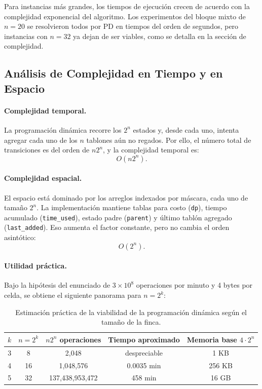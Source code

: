 \documentclass[12pt,a4paper]{article}
\begin{document}
Para instancias m\'as grandes, los tiempos de ejecuci\'on crecen de acuerdo con la complejidad exponencial del algoritmo. Los experimentos del bloque mixto de \(n=20\) se resolvieron todos por PD en tiempos del orden de segundos, pero instancias con \(n=32\) ya dejan de ser viables, como se detalla en la secci\'on de complejidad.

\subsection{An\'alisis de Complejidad en Tiempo y en Espacio}

\paragraph{Complejidad temporal.}
La programaci\'on din\'amica recorre los \(2^n\) estados y, desde cada uno, intenta agregar cada uno de los \(n\) tablones a\'un no regados. Por ello, el n\'umero total de transiciones es del orden de \(n2^n\), y la complejidad temporal es:
\[
O(n2^n).
\]

\paragraph{Complejidad espacial.}
El espacio est\'a dominado por los arreglos indexados por m\'ascara, cada uno de tama\~no \(2^n\). La implementaci\'on mantiene tablas para costo (\texttt{dp}), tiempo acumulado (\texttt{time\_used}), estado padre (\texttt{parent}) y \'ultimo tabl\'on agregado (\texttt{last\_added}). Eso aumenta el factor constante, pero no cambia el orden asint\'otico:
\[
O(2^n).
\]

\paragraph{Utilidad pr\'actica.}
Bajo la hip\'otesis del enunciado de \(3\times 10^8\) operaciones por minuto y 4 bytes por celda, se obtiene el siguiente panorama para \(n = 2^k\):

\begin{table}[H]
  \centering
  \begin{tabular}{ccccc}
    \toprule
    \(k\) & \(n=2^k\) & \(n2^n\) operaciones & Tiempo aproximado & Memoria base \(4 \cdot 2^n\) \\
    \midrule
    3 & 8  & 2,048              & despreciable & 1 KB \\
    4 & 16 & 1,048,576          & 0.0035 min   & 256 KB \\
    5 & 32 & 137,438,953,472    & 458 min      & 16 GB \\
    \bottomrule
  \end{tabular}
  \caption{Estimaci\'on pr\'actica de la viabilidad de la programaci\'on din\'amica seg\'un el tama\~no de la finca.}
\end{table}
\end{document}
